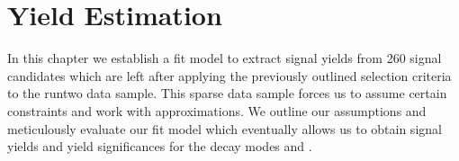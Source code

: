 \chapter{Yield Estimation}
\label{chap:fit}
In this chapter we establish a fit model to extract signal yields from \num{260} signal candidates which are left after applying the previously outlined selection criteria to the \gls{runtwo} data sample.
This sparse data sample forces us to assume certain constraints and work with approximations.
We outline our assumptions and meticulously evaluate our fit model which eventually allows us to obtain signal yields and yield significances for the decay modes \decay{\Lb}{\Dz\Lz} and \decay{\Xibz}{\Dz\Lz}.

